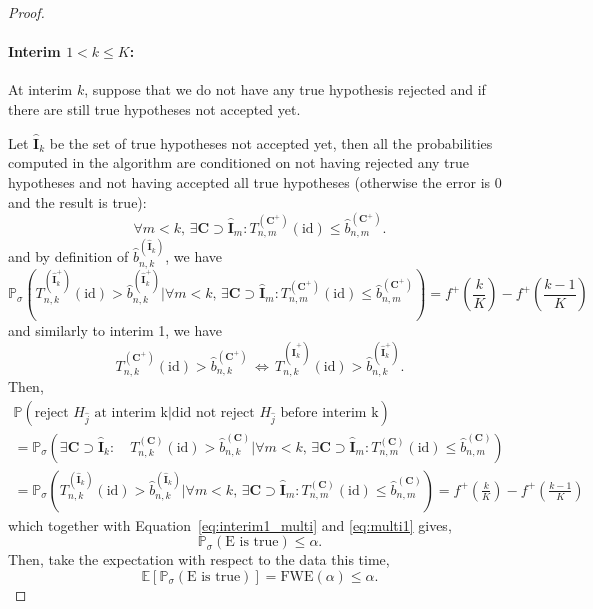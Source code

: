 \documentclass{article}
\theoremstyle{plain}
\theoremstyle{remark}
\renewcommand{\P}{\mathbb{P}}
\newcommand{\E}{\mathbb{E}}
\newcommand{\1}{\mathbbm{1}}
\newcommand{\id}{\mathrm{id}}
\numberwithin{equation}{section}
\begin{document}
\begin{proof}
\paragraph{Interim $1<k\le  K$:}

At interim $k$, suppose that we do not have any true hypothesis rejected and if there are still true hypotheses not accepted yet.

Let $\widehat{\textbf{I}}_k$ be the set of true hypotheses not accepted yet, then all the probabilities computed in the algorithm are conditioned on not having rejected any true hypotheses and not having accepted all true hypotheses (otherwise the error is $0$ and the result is true):
$$\forall m < k, \, \exists \textbf{C} \supset \widehat{\textbf{I}}_m  : T_{n,m}^{(\textbf{C}^+)}(\id) \le \widehat{b}_{n,m}^{(\textbf{C}^+)}.$$
and by definition of $\widehat{b}_{n,k}^{(\widehat{\textbf{I}}_k)}$, we have
$$\P_\sigma\left( T_{n,k}^{(\widehat{\textbf{I}}_k^+)}(\id)> \widehat{b}_{n,k}^{(\widehat{\textbf{I}}_k^+)} \Big|\forall m < k, \, \exists \textbf{C} \supset \widehat{\textbf{I}}_m  : T_{n,m}^{(\textbf{C}^+)}(\id) \le \widehat{b}_{n,m}^{(\textbf{C}^+)}\right) = f^+\left(\frac{k}{K}\right)-f^+\left(\frac{k-1}{K}\right) $$
and similarly to interim 1, we have 
$$T_{n,k}^{(\textbf{C}^+)}(\id)> \widehat{b}_{n,k}^{(\textbf{C}^+)}\, \Leftrightarrow \,
 T_{n,k}^{(\widehat{\textbf{I}}_k^+)}(\id) > \widehat{b}_{n,k}^{(\widehat{\textbf{I}}_k^+)}.$$
Then,
 \begin{multline*}
\P\left(\text{reject }H_{\widehat{j}} \text{ at interim k} \Big| \text{did not reject }H_{\widehat{j}} \text{ before interim k}\right)\\
= \P_\sigma\left( \exists \textbf{C} \supset \widehat{\textbf{I}}_k :\quad  T_{n,k}^{(\textbf{C})}(\id)> \widehat{b}_{n,k}^{(\textbf{C})} \Big|  \forall m < k, \, \exists \textbf{C} \supset \widehat{\textbf{I}}_m  : T_{n,m}^{(\textbf{C})}(\id) \le \widehat{b}_{n,m}^{(\textbf{C})}\right)\\
= \P_\sigma\left(T_{n,k}^{(\widehat{\textbf{I}}_k)}(\id) > \widehat{b}_{n,k}^{(\widehat{\textbf{I}}_k)}\Big|  \forall m < k, \, \exists \textbf{C} \supset \widehat{\textbf{I}}_m  : T_{n,m}^{(\textbf{C})}(\id) \le \widehat{b}_{n,m}^{(\textbf{C})} \right)
 = f^+\left(\frac{k}{K}\right)-f^+\left(\frac{k-1}{K}\right)
\end{multline*}
which together with Equation~\eqref{eq:interim1_multi} and \eqref{eq:multi1} gives,
$$\P_\sigma(\text{E is true})\le \alpha.$$
Then, take the expectation with respect to the data this time, 
$$\E\left[\P_\sigma(\text{E is true})\right] = \mathrm{FWE}(\alpha) \le \alpha. $$
\end{proof}
\end{document}
